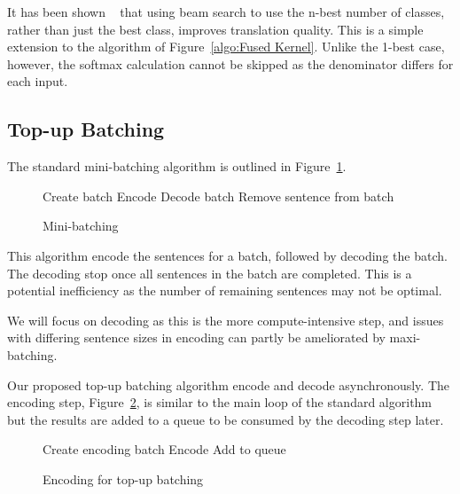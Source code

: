 \documentclass[11pt,a4paper]{article}
\begin{document}
It has been shown ~\citep{koehn-knowles:2017:NMT} that using beam search to use the n-best number of classes, rather than just the best class, improves translation quality. This is a simple extension to the algorithm of Figure~\ref{algo:Fused Kernel}. Unlike the 1-best case, however, the softmax calculation cannot be skipped as the denominator differs for each input.


\subsection{Top-up Batching}

The standard mini-batching algorithm is outlined in Figure~\ref{algo:Mini-batching}.

\begin{figure} [h]
\begin{algorithmic}
  \STATE Create batch
  \STATE Encode
    \STATE Decode batch
        \STATE Remove sentence from batch
      \ENDIF
    \ENDFOR
  \ENDWHILE
\ENDWHILE 
\end{algorithmic}
\caption{Mini-batching}
\label{algo:Mini-batching}
\end{figure}

This algorithm encode the sentences for a batch, followed by decoding the batch. The decoding stop once all sentences in the batch are completed. This is a potential inefficiency as the number of remaining sentences may not be optimal.

We will focus on decoding as this is the more compute-intensive step, and issues with differing sentence sizes in encoding can partly be ameliorated by maxi-batching.

Our proposed top-up batching algorithm encode and decode asynchronously. The encoding step, Figure~\ref{algo:Encoding for top-up batching}, is similar to the main loop of the standard algorithm but the results are added to a queue to be consumed by the decoding step later.

\begin{figure} [h]
\begin{algorithmic}
  \STATE Create encoding batch
  \STATE Encode
  \STATE Add to queue
\ENDWHILE 
\end{algorithmic}
\caption{Encoding for top-up batching}
\label{algo:Encoding for top-up batching}
\end{figure}
\end{document}
